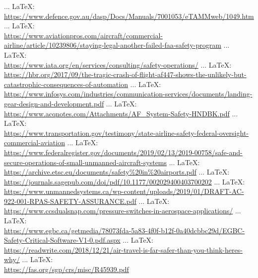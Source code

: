\begin{thebibliography}{99}
{{{{{{ ... \LaTeX:\\ \url{https://www.defence.gov.au/dasp/Docs/Manuals/7001053/eTAMMweb/1049.htm}
 ... \LaTeX:\\ \url{https://www.aviationpros.com/aircraft/commercial-airline/article/10239806/staying-legal-another-failed-faa-safety-program}
 ... \LaTeX:\\ \url{https://www.iata.org/en/services/consulting/safety-operations/}
 ... \LaTeX:\\ \url{https://hbr.org/2017/09/the-tragic-crash-of-flight-af447-shows-the-unlikely-but-catastrophic-consequences-of-automation}
 ... \LaTeX:\\ \url{https://www.infosys.com/industries/communication-services/documents/landing-gear-design-and-development.pdf}
 ... \LaTeX:\\ \url{https://www.acqnotes.com/Attachments/AF_System-Safety-HNDBK.pdf}
 ... \LaTeX:\\ \url{https://www.transportation.gov/testimony/state-airline-safety-federal-oversight-commercial-aviation}
 ... \LaTeX:\\ \url{https://www.federalregister.gov/documents/2019/02/13/2019-00758/safe-and-secure-operations-of-small-unmanned-aircraft-systems}
 ... \LaTeX:\\ \url{https://archive.etsc.eu/documents/safety%20in%20airports.pdf}
 ... \LaTeX:\\ \url{https://journals.sagepub.com/doi/pdf/10.1177/002029400403700202}
 ... \LaTeX:\\ \url{https://www.unmannedsystems.ca/wp-content/uploads/2019/01/DRAFT-AC-922-001-RPAS-SAFETY-ASSURANCE.pdf}
 ... \LaTeX:\\ \url{https://www.ccsdualsnap.com/pressure-switches-in-aerospace-applications/}
 ... \LaTeX:\\ \url{https://www.egbc.ca/getmedia/78073fda-5a83-4f0f-b12f-0a40dcbbc29d/EGBC-Safety-Critical-Software-V1-0.pdf.aspx}
 ... \LaTeX:\\ \url{https://readwrite.com/2018/12/21/air-travel-is-far-safer-than-you-think-heres-why/}
 ... \LaTeX:\\ \url{https://fas.org/sgp/crs/misc/R45939.pdf}
}}}}}}
\end{thebibliography}
